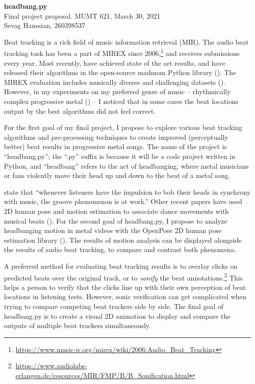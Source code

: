 \documentclass[letter,12pt]{report}
\begin{document}
\noindent\Large{\textbf{headbang.py}}\\
\large{Final project proposal. MUMT 621, March 30, 2021}\\
\large{Sevag Hanssian, 260398537}

\noindent\hrulefill

\vspace{2em}

Beat tracking is a rich field of music information retrieval (MIR). The audio beat tracking task has been a part of MIREX since 2006,\footnote{\url{https://www.music-ir.org/mirex/wiki/2006:Audio_Beat_Tracking}} and receives submissions every year. Most recently, \textcite{bock1, bock2} have achieved state of the art results, and have released their algorithms in the open-source madmom Python library (\cite{madmom}). The MIREX evaluation includes musically diverse and challenging datasets (\cite{beatmeta}). However, in my experiments on my preferred genre of music -- rhythmically complex progressive metal (\cite{meshuggah, periphery}) -- I noticed that in some cases the beat locations output by the best algorithms did not feel correct.

For the first goal of my final project, I propose to explore various beat tracking algorithms and pre-processing techniques to create improved (perceptually better) beat results in progressive metal songs. The name of the project is ``headbang.py''; the ``.py'' suffix is because it will be a code project written in Python, and ``headbang'' refers to the act of headbanging, where metal musicians or fans violently move their head up and down to the beat of a metal song.

\textcite{groove} state that ``whenever listeners have the impulsion to bob their heads in synchrony with music, the groove phenomenon is at work.'' Other recent papers have used 2D human pose and motion estimation to associate dance movements with musical beats (\cite{pose1, pose2}). For the second goal of headbang.py, I propose to analyze headbanging motion in metal videos with the OpenPose 2D human pose estimation library (\cite{openpose}). The results of motion analysis can be displayed alongside the results of audio beat tracking, to compare and contrast both phenomena.

A preferred method for evaluating beat tracking results is to overlay clicks on predicted beats over the original track, or to \textit{sonify} the beat annotations.\footnote{\url{https://www.audiolabs-erlangen.de/resources/MIR/FMP/B/B_Sonification.html}} This helps a person to verify that the clicks line up with their own perception of beat locations in listening tests. However, sonic verification can get complicated when trying to compare competing beat trackers side by side. The final goal of headbang.py is to create a visual 2D animation to display and compare the outputs of multiple beat trackers simultaneously.

\vfill
\clearpage

\printbibheading[title={\vspace{-3.5em}References},heading=bibnumbered]
\vspace{-1.5em}
\printbibliography[heading=none]
\end{document}

